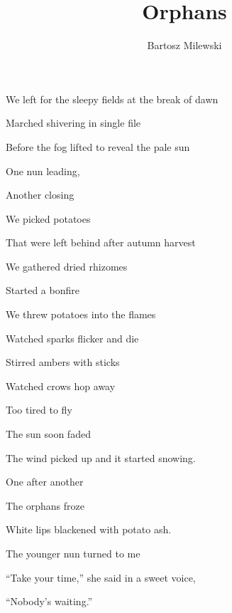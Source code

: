 \documentclass{memoir}
\author{Bartosz Milewski}
\title{Orphans}
\date{}
\begin{document}
\maketitle{}



We left for the sleepy fields at the break of dawn

Marched shivering in single file

Before the fog lifted to reveal the pale sun

One nun leading, 

Another closing

\bigskip

We picked potatoes

That were left behind after autumn harvest

We gathered dried rhizomes

Started a bonfire

\bigskip

We threw potatoes into the flames

Watched sparks flicker and die

Stirred ambers with sticks

Watched crows hop away

Too tired to fly

\bigskip

The sun soon faded

The wind picked up and it started snowing.

One after another

The orphans froze

White lips blackened with potato ash.

\bigskip

The younger nun turned to me

``Take your time,'' she said in a sweet voice,

``Nobody's waiting.''
\end{document}
